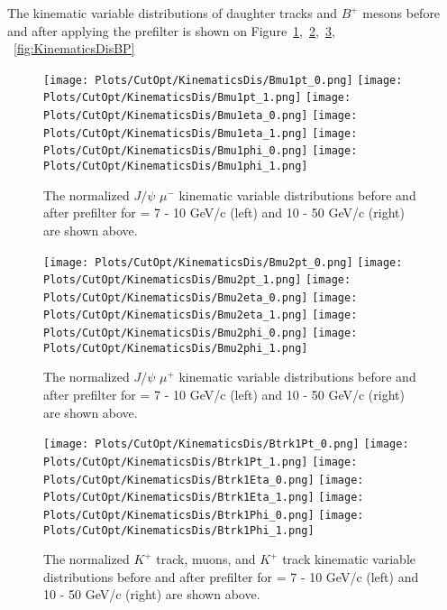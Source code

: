 The kinematic variable distributions of daughter tracks and $B^+$ mesons before and after applying the prefilter is shown on Figure~\ref{fig:KinematicsDisMuon1},~\ref{fig:KinematicsDisMuon2},~\ref{fig:KinematicsDisKaon}, ~\ref{fig:KinematicsDisBP}

\clearpage


\begin{figure}[h]
\begin{center}
\texttt{[image: Plots/CutOpt/KinematicsDis/Bmu1pt\_0.png]}
\texttt{[image: Plots/CutOpt/KinematicsDis/Bmu1pt\_1.png]}
\texttt{[image: Plots/CutOpt/KinematicsDis/Bmu1eta\_0.png]}
\texttt{[image: Plots/CutOpt/KinematicsDis/Bmu1eta\_1.png]}
\texttt{[image: Plots/CutOpt/KinematicsDis/Bmu1phi\_0.png]}
\texttt{[image: Plots/CutOpt/KinematicsDis/Bmu1phi\_1.png]}
\caption{The normalized $J/\psi$ $\mu^-$ kinematic variable distributions before and after prefilter for \pt = 7 - 10 GeV/c (left) and 10 - 50 GeV/c (right) are shown above.}
\label{fig:KinematicsDisMuon1}
\end{center}
\end{figure}


\clearpage

\begin{figure}[h]
\begin{center}
\texttt{[image: Plots/CutOpt/KinematicsDis/Bmu2pt\_0.png]}
\texttt{[image: Plots/CutOpt/KinematicsDis/Bmu2pt\_1.png]}
\texttt{[image: Plots/CutOpt/KinematicsDis/Bmu2eta\_0.png]}
\texttt{[image: Plots/CutOpt/KinematicsDis/Bmu2eta\_1.png]}
\texttt{[image: Plots/CutOpt/KinematicsDis/Bmu2phi\_0.png]}
\texttt{[image: Plots/CutOpt/KinematicsDis/Bmu2phi\_1.png]}
\caption{The normalized $J/\psi$ $\mu^+$ kinematic variable distributions before and after prefilter for \pt = 7 - 10 GeV/c (left) and 10 - 50 GeV/c (right) are shown above.}
\label{fig:KinematicsDisMuon2}
\end{center}
\end{figure}



\clearpage

\begin{figure}[h]
\begin{center}
\texttt{[image: Plots/CutOpt/KinematicsDis/Btrk1Pt\_0.png]}
\texttt{[image: Plots/CutOpt/KinematicsDis/Btrk1Pt\_1.png]}
\texttt{[image: Plots/CutOpt/KinematicsDis/Btrk1Eta\_0.png]}
\texttt{[image: Plots/CutOpt/KinematicsDis/Btrk1Eta\_1.png]}
\texttt{[image: Plots/CutOpt/KinematicsDis/Btrk1Phi\_0.png]}
\texttt{[image: Plots/CutOpt/KinematicsDis/Btrk1Phi\_1.png]}
\caption{The normalized $K^+$ track, muons, and $K^+$ track kinematic variable distributions before and after prefilter for \pt = 7 - 10 GeV/c (left) and 10 - 50 GeV/c (right) are shown above.}
\label{fig:KinematicsDisKaon}
\end{center}
\end{figure}

